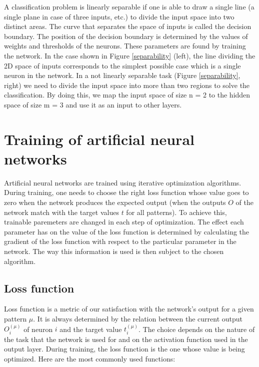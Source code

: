 A classification problem is linearly separable if one is able to draw a single line (a single plane in case of three inputs, etc.) to divide the input space into two distinct areas. The curve that separates the space of inputs is called the decision boundary. The position of the decision boundary is determined by the values of weights and thresholds of the neurons. These parameters are found by training the network. In the case shown in Figure \ref{separability} (left), the line dividing the 2D space of inputs corresponds to the simplest possible case which is a single neuron in the network. In a not linearly separable task (Figure \ref{separability}, right) we need to divide the input space into more than two regions to solve the classification. By doing this, we map the input space of size n = 2 to the hidden space of size m = 3 and use it as an input to other layers. \cite{mehlig}


\newpage

\section{Training of artificial neural networks}

Artificial neural networks are trained using iterative optimization algorithms. During training, one needs to choose the right loss function whose value goes to zero when the network produces the expected output (when the outputs $ O $ of the network match with the target values $ t $ for all patterns). To achieve this, trainable paremeters are changed in each step of optimization. The effect each parameter has on the value of the loss function is determined by calculating the gradient of the loss function with respect to the particular parameter in the network. The way this information is used is then subject to the chosen algorithm. \cite{notes}

\subsection{Loss function}

Loss function is a metric of our satisfaction with the network's output for a given pattern $ \mu $. It is always determined by the relation between the current output $ O_{i}^{(\mu)} $ of neuron $ i $ and the target value $ t_{i}^{(\mu)} $. The choice depends on the nature of the task that the network is used for and on the activation function used in the output layer. During training, the loss function is the one whose value is being optimized. Here are the most commonly used functions: \cite{mehlig}

